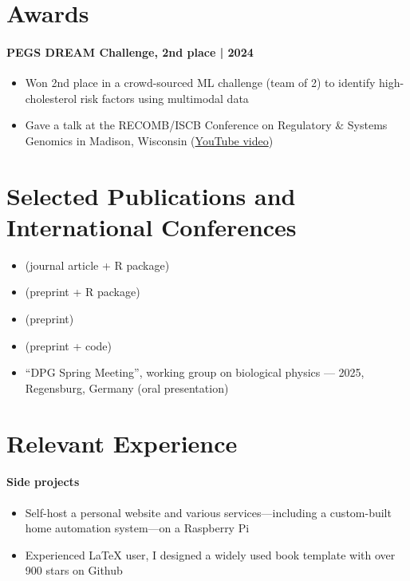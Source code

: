 \documentclass[
	DIV=15,
]{scrartcl}
\begin{document}
\section*{Awards}

\paragraph{PEGS DREAM Challenge, 2nd place | 2024}
\begin{itemize}
	\item Won 2nd place in a crowd-sourced ML challenge (team of 2) to identify high-cholesterol risk factors using multimodal data
	\item Gave a talk at the RECOMB/ISCB Conference on Regulatory \& Systems Genomics in Madison, Wisconsin (\href{https://www.youtube.com/watch?v=QCDiowWxeJM}{YouTube video})
\end{itemize}

\section*{Selected Publications and International Conferences}

\begin{itemize}
	\item {} (journal article + R package)
	\item {} (preprint + R package)
	\item {} (preprint)
	\item {} (preprint + code)
	\item \enquote{DPG Spring Meeting}, working group on biological physics --- 2025, Regensburg, Germany (oral presentation)
\end{itemize}

\section*{Relevant Experience}

\paragraph{Side projects}
\begin{itemize}
	\item Self-host a personal website and various services---including a custom-built home automation system---on a Raspberry Pi
	\item Experienced LaTeX user, I designed a widely used book template with over 900 stars on Github
\end{itemize}
\end{document}
